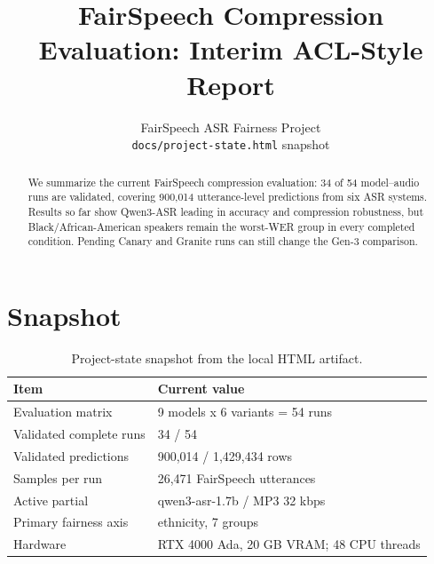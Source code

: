 \documentclass[11pt]{article}
\title{FairSpeech Compression Evaluation: Interim ACL-Style Report}
\author{FairSpeech ASR Fairness Project \\
  \texttt{docs/project-state.html} snapshot}
\begin{document}
\maketitle
\begin{abstract}
We summarize the current FairSpeech compression evaluation: 34 of 54 model--audio runs are validated, covering 900,014 utterance-level predictions from six ASR systems. Results so far show Qwen3-ASR leading in accuracy and compression robustness, but Black/African-American speakers remain the worst-WER group in every completed condition. Pending Canary and Granite runs can still change the Gen-3 comparison.
\end{abstract}

\section{Snapshot}

\begin{table}[t]
\centering
\scriptsize
\begin{tabular}{@{}ll@{}}
\toprule
Item & Current value \\
\midrule
Evaluation matrix & 9 models x 6 variants = 54 runs \\
Validated complete runs & 34 / 54 \\
Validated predictions & 900,014 / 1,429,434 rows \\
Samples per run & 26,471 FairSpeech utterances \\
Active partial & qwen3-asr-1.7b / MP3 32 kbps \\
Primary fairness axis & ethnicity, 7 groups \\
Hardware & RTX 4000 Ada, 20 GB VRAM; 48 CPU threads \\
\bottomrule
\end{tabular}
\caption{Project-state snapshot from the local HTML artifact.}
\label{tab:snapshot}
\end{table}
\end{document}
